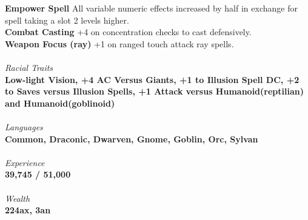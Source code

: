 \documentclass[letterpaper]{article}
\newcommand{\e}[1]{\emph{#1}}
\newcommand{\B}[1]{\textbf{#1}}
\begin{document}
\B{Empower Spell} All variable numeric effects increased by half in exchange for spell taking a slot 2 levels higher. \\
\B{Combat Casting} +4 on concentration checks to cast defensively. \\
\B{Weapon Focus (ray)} +1 on ranged touch attack ray spells. \\
\\
\e{Racial Traits} \\
\B{Low-light Vision, +4 AC Versus Giants, +1 to Illusion Spell DC, +2 to Saves versus Illusion Spells, +1 Attack versus Humanoid(reptilian) and Humanoid(goblinoid)} \\
\\
\e{Languages} \\
\B{Common, Draconic, Dwarven, Gnome, Goblin, Orc, Sylvan} \\
\\
{\e{Experience}} \\
\B{39,745 / 51,000} \\
\\
{\e{Wealth}} \\
\B{224ax, 3an}
\end{document}
